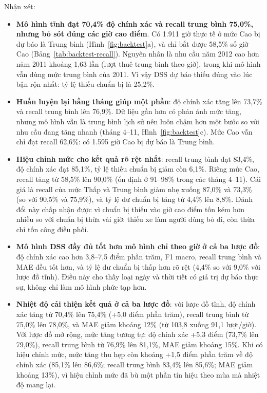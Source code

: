 \noindent Nhận xét:
\begin{itemize}
    \item \textbf{Mô hình tĩnh đạt 70,4\% độ chính xác và recall trung bình 75,0\%, nhưng bỏ sót đúng các giờ cao điểm}. Có 1.911 giờ thực tế ở mức Cao bị dự báo là Trung bình (Hình~\ref{fig:backtest}a), và chỉ bắt được 58,5\% số giờ Cao (Bảng~\ref{tab:backtest-recall}). Nguyên nhân là nhu cầu năm 2012 cao hơn năm 2011 khoảng 1,63 lần (lượt thuê trung bình theo giờ), trong khi mô hình vẫn dùng mức trung bình của 2011. Vì vậy DSS dự báo thiếu đúng vào lúc bận rộn nhất: tỷ lệ thiếu chuẩn bị là 25,2\%.
    \item \textbf{Huấn luyện lại hằng tháng giúp một phần}: độ chính xác tăng lên 73,7\% và recall trung bình lên 76,9\%. Dữ liệu gần hơn có phản ánh mức tăng, nhưng mô hình vẫn là trung bình lịch sử nên luôn chậm hơn một bước so với nhu cầu đang tăng nhanh (tháng 4--11, Hình~\ref{fig:backtest}c). Mức Cao vẫn chỉ đạt recall 62,6\%: có 1.595 giờ Cao bị dự báo là Trung bình.
    \item \textbf{Hiệu chỉnh mức cho kết quả rõ rệt nhất}: recall trung bình đạt 83,4\%, độ chính xác đạt 85,1\%, tỷ lệ thiếu chuẩn bị giảm còn 6,1\%. Riêng mức Cao, recall tăng từ 58,5\% lên 90,0\% (ổn định ở 91--98\% trong các tháng 4--11). Cái giá là recall của mức Thấp và Trung bình giảm nhẹ xuống 87,0\% và 73,3\% (so với 90,5\% và 75,9\%), và tỷ lệ dư chuẩn bị tăng từ 4,4\% lên 8,8\%. Đánh đổi này chấp nhận được vì chuẩn bị thiếu vào giờ cao điểm tốn kém hơn nhiều so với chuẩn bị thừa vài giờ: thiếu xe làm người dùng bỏ đi, còn thừa chỉ tốn công điều phối.
    \item \textbf{Mô hình DSS đầy đủ tốt hơn mô hình chỉ theo giờ ở cả ba lược đồ}: độ chính xác cao hơn 3,8--7,5 điểm phần trăm, F1 macro, recall trung bình và MAE đều tốt hơn, và tỷ lệ dư chuẩn bị thấp hơn rõ rệt (4,4\% so với 9,0\% với lược đồ tĩnh). Điều này cho thấy loại ngày và thời tiết có giá trị dự báo thực sự, không chỉ làm mô hình phức tạp hơn.
    \item \textbf{Nhiệt độ cải thiện kết quả ở cả ba lược đồ}: với lược đồ tĩnh, độ chính xác tăng từ 70,4\% lên 75,4\% (+5,0 điểm phần trăm), recall trung bình từ 75,0\% lên 78,0\%, và MAE giảm khoảng 12\% (từ 103,8 xuống 91,1 lượt/giờ). Với lược đồ mở rộng, mức tăng tương tự: độ chính xác +5,3 điểm (73,7\% lên 79,0\%), recall trung bình từ 76,9\% lên 81,1\%, MAE giảm khoảng 15\%. Khi có hiệu chỉnh mức, mức tăng thu hẹp còn khoảng +1,5 điểm phần trăm về độ chính xác (85,1\% lên 86,6\%; recall trung bình 83,4\% lên 85,6\%; MAE giảm khoảng 13\%), vì hiệu chỉnh mức đã bù một phần tín hiệu theo mùa mà nhiệt độ mang lại.

\end{itemize}
